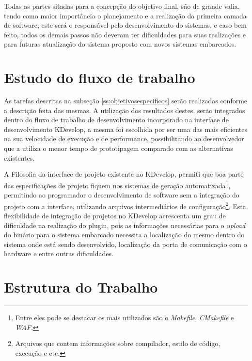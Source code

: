 Todas as partes sitadas para a concepção do objetivo final, são de grande valia, tendo como maior importância o planejamento e a realização da primeira camada de software, este será o responsável pelo desenvolvimento do sistemas, e caso bem feito, todos os demais passos não deveram ter dificuldades para suas realizações e para futuras atualização do sistema proposto com novos sistemas embarcados.

\section{Estudo do fluxo de trabalho}

As tarefas descritas na subseção \ref{ss:objetivosespecificos} serão realizadas conforme a descrição feita das mesmas. A utilização dos resultados destes, serão integrados dentro do fluxo de trabalho de desenvolvimento incorporado na interface de desenvolvimento KDevelop, a mesma foi escolhida por ser uma das mais eficientes na sua velocidade de execução e de performance, possibilitando ao desenvolvedor que a utiliza o menor tempo de prototipagem comparado com as alternativas existentes.

A Filosofia da interface de projeto existente no KDevelop, permiti que boa parte das especificações de projeto fiquem nos sistemas de geração automatizada\footnote{Entre eles pode se destacar os mais utilizados são o \textit{Makefile}, \textit{CMakefile} e \textit{WAF}.}, permitindo ao programador o desenvolvimento de software sem a integração do projeto com a interface, utilizando arquivos intermediários de configuração\footnote{Arquivos que contem informações sobre compilador, estilo de código, execução e etc.}. Esta flexibilidade de integração de projetos no KDevelop acrescenta um grau de dificuldade na realização do plugin, pois as informações necessárias para o \textit{upload} do binário para o sistema embarcado necessita a localização do mesmo dentro do sistema onde está sendo desenvolvido, localização da porta de comunicação com o hardware e entre outras dificuldades. %

\section{Estrutura do Trabalho}

